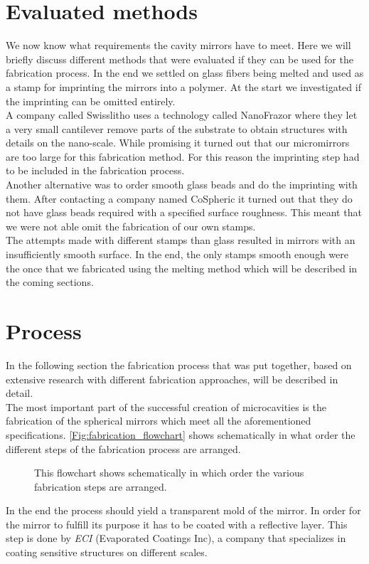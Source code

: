 \section{Evaluated methods}
We now know what requirements the cavity mirrors have to meet. Here we will briefly discuss different methods that were evaluated if they can be used for the fabrication process. In the end we settled on glass fibers being melted and used as a stamp for imprinting the mirrors into a polymer. At the start we investigated if the imprinting can be omitted entirely.\\
A company called Swisslitho uses a technology called NanoFrazor where they let a very small cantilever remove parts of the substrate to obtain structures with details on the nano-scale. While promising it turned out that our micromirrors are too large for this fabrication method. For this reason the imprinting step had to be included in the fabrication process.\\
Another alternative was to order smooth glass beads and do the imprinting with them. After contacting a company named CoSpheric it turned out that they do not have glass beads required with a specified surface roughness. This meant that we were not able omit the fabrication of our own stamps.\\
The attempts made with different stamps than glass resulted in mirrors with an insufficiently smooth surface. In the end, the only stamps smooth enough were the once that we fabricated using the melting method which will be described in the coming sections.
\newpage


\section{Process}
In the following section the fabrication process that was put together, based on extensive research with different fabrication approaches, will be described in detail.\\
The most important part of the successful creation of microcavities is the fabrication of the spherical mirrors which meet all the aforementioned specifications. \autoref{Fig:fabrication_flowchart} shows schematically in what order the different steps of the fabrication process are arranged.
\begin{figure}[H]
	
	\caption{This flowchart shows schematically in which order the various fabrication steps are arranged.}
	\label{Fig:fabrication_flowchart}
\end{figure}
In the end the process should yield a transparent mold of the mirror. In order for the mirror to fulfill its purpose it has to be coated with a reflective layer. This step is done by \textit{ECI} (Evaporated Coatings Inc), a company that specializes in coating sensitive structures on different scales.
